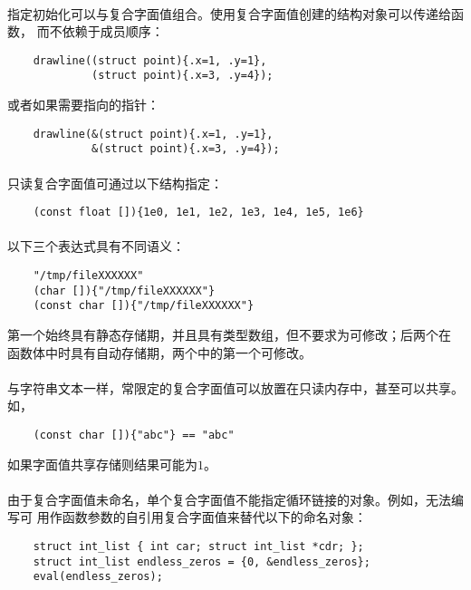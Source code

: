 {\paragraph{}
\ex 指定初始化可以与复合字面值组合。使用复合字面值创建的结构对象可以传递给函数，
而不依赖于成员顺序：
\begin{lstlisting}
    drawline((struct point){.x=1, .y=1},
             (struct point){.x=3, .y=4});
\end{lstlisting}
或者如果需要指向的指针：
\begin{lstlisting}
    drawline(&(struct point){.x=1, .y=1},
             &(struct point){.x=3, .y=4});
\end{lstlisting}

\paragraph{}
\ex 只读复合字面值可通过以下结构指定：
\begin{lstlisting}
    (const float []){1e0, 1e1, 1e2, 1e3, 1e4, 1e5, 1e6}
\end{lstlisting}

\paragraph{}
\ex 以下三个表达式具有不同语义：
\begin{lstlisting}
    "/tmp/fileXXXXXX"
    (char []){"/tmp/fileXXXXXX"}
    (const char []){"/tmp/fileXXXXXX"}
\end{lstlisting}
第一个始终具有静态存储期，并且具有类型数组，但不要求为可修改；后两个在
函数体中时具有自动存储期，两个中的第一个可修改。

\paragraph{}
\ex 与字符串文本一样，常限定的复合字面值可以放置在只读内存中，甚至可以共享。如，
\begin{lstlisting}
    (const char []){"abc"} == "abc"
\end{lstlisting}
如果字面值共享存储则结果可能为$1$。

\paragraph{}
\ex 由于复合字面值未命名，单个复合字面值不能指定循环链接的对象。例如，无法编写可
用作函数参数的自引用复合字面值来替代以下的命名对象：
\begin{lstlisting}
    struct int_list { int car; struct int_list *cdr; };
    struct int_list endless_zeros = {0, &endless_zeros};
    eval(endless_zeros);
\end{lstlisting}

}
